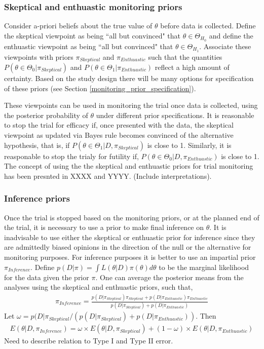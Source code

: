 \documentclass[12pt]{article}
\begin{document}
\subsubsection{Skeptical and enthuastic monitoring priors}

Consider a-priori beliefs about the true value of $\theta$ before data is collected. Define the skeptical viewpoint as being ``all but convinced" that $\theta\in\Theta_{H_0}$ and define the enthuastic viewpoint as being ``all but convinced" that $\theta\in\Theta_{H_1}$. Associate these viewpoints with priors $\pi_{Skeptical}$ and $\pi_{Enthuastic}$ such that the quantities $P(\theta\in\Theta_0|\pi_{Skeptical})$ and $P(\theta\in\Theta_1|\pi_{Enthuastic})$ reflect a high amount of certainty. Based on the study design there will be many options for specification of these priors (see Section \ref{monitoring_prior_specification}).


These viewpoints can be used in monitoring the trial once data is collected, using the posterior probability of $\theta$ under different prior specifications. It is reasonable to stop the trial for efficacy if, once presented with the data, the skeptical viewpoint as updated via Bayes rule becomes convinced of the alternative hypothesis, that is, if $P(\theta\in\Theta_1|D,\pi_{Skeptical})$ is close to 1. Similarly, it is reasponable to stop the trialy for futility if, $P(\theta\in\Theta_0|D,\pi_{Enthuastic})$ is close to 1. The concept of using the the skeptical and enthuastic priors for trial monitoring has been presnted in XXXX and YYYY. (Include interpretations).

\subsubsection{Inference priors}
Once the trial is stopped based on the monitoring priors, or at the planned end of the trial, it is necessary to use a prior to make final inference on $\theta$. It is inadvisable to use either the skeptical or enthuastic prior for inference since they are admittedly biased opinions in the direction of the null or the alternative for monitoring purposes. For inference purposes it is better to use an impartial prior $\pi_{Inference}$.  Define $p(D|\pi)=\int L (\theta|D)\pi(\theta)d\theta$ to be the marginal likelihood for the data given the prior $\pi$. One can average the posterior means from the analyses using the skeptical and enthuastic priors, such that,
\begin{align*}
\pi_{Inference}=\frac{p(D|\pi_{Skeptical})\pi_{Skeptical}+p(D|\pi_{Enthuastic})\pi_{Enthuastic}}{p(D|\pi_{Skeptical})+p(D|\pi_{Enthuastic})}
\end{align*}
Let $\omega=p(D|\pi_{Skeptical}/(p(D|\pi_{Skeptical})+p(D|\pi_{Enthuastic}))$. Then
\begin{align*}
E(\theta|D,\pi_{Inference})=\omega\times E(\theta|D,\pi_{Skeptical})+(1-\omega)\times E(\theta|D,\pi_{Enthuastic})
\end{align*}
Need to describe relation to Type I and Type II error.
\end{document}
